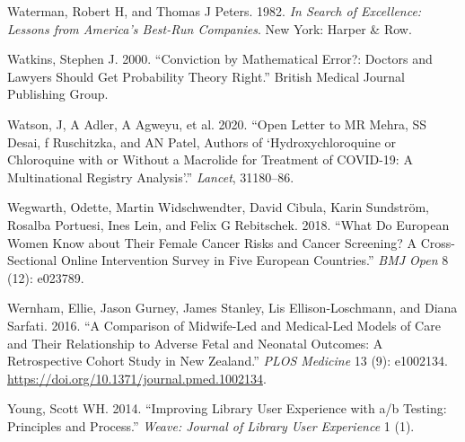 \documentclass[
  10pt,
  b5paper]{book}
\newlength{\cslhangindent}
\newlength{\cslentryspacingunit} %
\newenvironment{CSLReferences}[2] %
 {%
  \setlength{\parindent}{0pt}
  \ifodd #1
  \let\oldpar\par
  \def\par{\hangindent=\cslhangindent\oldpar}
  \fi
  \setlength{\parskip}{#2\cslentryspacingunit}
 }%
 {}
\begin{document}
\begin{CSLReferences}{1}{0}
\leavevmode{}%
Waterman, Robert H, and Thomas J Peters. 1982. \emph{In Search of Excellence: Lessons from America's Best-Run Companies}. New York: Harper \& Row.

\leavevmode{}%
Watkins, Stephen J. 2000. {``Conviction by Mathematical Error?: Doctors and Lawyers Should Get Probability Theory Right.''} British Medical Journal Publishing Group.

\leavevmode{}%
Watson, J, A Adler, A Agweyu, et al. 2020. {``Open Letter to MR Mehra, SS Desai, f Ruschitzka, and AN Patel, Authors of {`Hydroxychloroquine or Chloroquine with or Without a Macrolide for Treatment of COVID-19: A Multinational Registry Analysis'}.''} \emph{Lancet}, 31180--86.

\leavevmode{}%
Wegwarth, Odette, Martin Widschwendter, David Cibula, Karin Sundström, Rosalba Portuesi, Ines Lein, and Felix G Rebitschek. 2018. {``What Do European Women Know about Their Female Cancer Risks and Cancer Screening? A Cross-Sectional Online Intervention Survey in Five European Countries.''} \emph{BMJ Open} 8 (12): e023789.

\leavevmode{}%
Wernham, Ellie, Jason Gurney, James Stanley, Lis Ellison-Loschmann, and Diana Sarfati. 2016. {``A Comparison of Midwife-Led and Medical-Led Models of Care and Their Relationship to Adverse Fetal and Neonatal Outcomes: A Retrospective Cohort Study in New Zealand.''} \emph{PLOS Medicine} 13 (9): e1002134. \url{https://doi.org/10.1371/journal.pmed.1002134}.

\leavevmode{}%
Young, Scott WH. 2014. {``Improving Library User Experience with a/b Testing: Principles and Process.''} \emph{Weave: Journal of Library User Experience} 1 (1).

\end{CSLReferences}

\newpage
\end{document}
